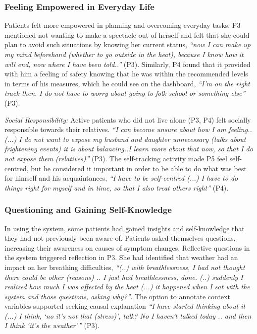 \subsubsection{Feeling Empowered in Everyday Life}
Patients felt more empowered in planning and overcoming everyday tasks. P3 mentioned not wanting to make a spectacle out of herself and felt that she could plan to avoid such situations by knowing her current status, \textit{“now I can make up my mind beforehand (whether to go outside in the heat), because I know how it will end, now where I have been told..”} (P3). Similarly, P4 found that it provided with him a feeling of safety knowing that he was within the recommended levels in terms of his measures, which he could see on the dashboard, \textit{“I’m on the right track then. I do not have to worry about going to folk school or something else”} (P3). 

\textit{Social Responsibility:} Active patients who did not live alone (P3, P4) felt socially responsible towards their relatives. \textit{“I can become unsure about how I am feeling.. (...) I do not want to expose my husband and daughter unnecessary (talks about frightening events) it is about balancing..I learn more about that now, so that I do not expose them (relatives)”} (P3). The self-tracking activity made P5 feel self-centred, but he considered it important in order to be able to do what was best for himself and his acquaintances, \textit{“I have to be self-centred (...) I have to do things right for myself and in time, so that I also treat others right”} (P4). 

\subsubsection{Questioning and Gaining Self-Knowledge}
In using the system, some patients had gained insights and self-knowledge that they had not previously been aware of. Patients asked themselves questions, increasing their awareness on causes of symptom changes. Reflective questions in the system triggered reflection in P3. She had identified that weather had an impact on her breathing difficulties, \textit{“(..) with breathlessness, I had not thought there could be other (reasons) .. I just had breathlessness, done. (..) suddenly I realized how much I was affected by the heat (...) it happened when I sat with the system and those questions, asking why?”}. The option to annotate context variables supported seeking causal explanation \textit{“I have started thinking about it (...) I think, ‘no it’s not that (stress)’, talk? No I haven’t talked today .. and then I think ‘it’s the weather’”} (P3).
 
